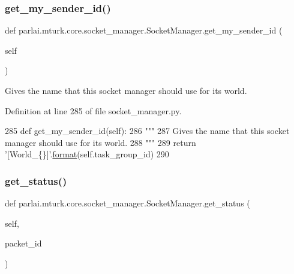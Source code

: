 \subsubsection{\texorpdfstring{get\+\_\+my\+\_\+sender\+\_\+id()}{get\_my\_sender\_id()}}
{\footnotesize\ttfamily def parlai.\+mturk.\+core.\+socket\+\_\+manager.\+Socket\+Manager.\+get\+\_\+my\+\_\+sender\+\_\+id (\begin{DoxyParamCaption}\item[{}]{self }\end{DoxyParamCaption})}

\begin{DoxyVerb}Gives the name that this socket manager should use for its world.
\end{DoxyVerb}
 

Definition at line 285 of file socket\+\_\+manager.\+py.


\begin{DoxyCode}
285     \textcolor{keyword}{def }get\_my\_sender\_id(self):
286         \textcolor{stringliteral}{"""}
287 \textcolor{stringliteral}{        Gives the name that this socket manager should use for its world.}
288 \textcolor{stringliteral}{        """}
289         \textcolor{keywordflow}{return} \textcolor{stringliteral}{'[World\_\{\}]'}.\hyperlink{namespaceparlai_1_1chat__service_1_1services_1_1messenger_1_1shared__utils_a32e2e2022b824fbaf80c747160b52a76}{format}(self.task\_group\_id)
290 
\end{DoxyCode}
\mbox{\label{classparlai_1_1mturk_1_1core_1_1socket__manager_1_1SocketManager_ad14d75f5b3a3e41a9133de9cd1611b8b}} 
\subsubsection{\texorpdfstring{get\+\_\+status()}{get\_status()}}
{\footnotesize\ttfamily def parlai.\+mturk.\+core.\+socket\+\_\+manager.\+Socket\+Manager.\+get\+\_\+status (\begin{DoxyParamCaption}\item[{}]{self,  }\item[{}]{packet\+\_\+id }\end{DoxyParamCaption})}

